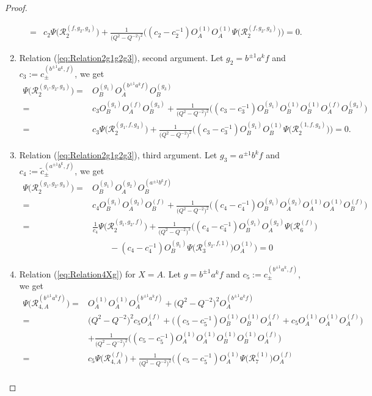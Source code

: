 \documentclass{amsart}
\newcommand{\R}{\mathcal R}
\begin{document}
\begin{proof}
\begin{enumerate}[\qquad1.]
\begin{align*}
=&c_2\Psi\big(\R_{2}^{(f,g_2,g_3)}\big)+\frac1{\big(Q^2-Q^{-2}\big)^2}\Big((c_2-c_2^{-1})O_A^{(1)}O_A^{(1)}\Psi\big(\R_{2}^{(f,g_2,g_3)}\big)\Big)=0.
\end{align*}
\item Relation (\ref{eq:Relation2g1g2g3}), second argument. Let $g_2=b^{\pm1}a^kf$ and $c_3:=c_{\pm}^{(b^{\pm1}a^k,f)}$, we get
\begin{align*}
\Psi\big(\R_{2}^{(g_1,g_2,g_3)}\big)=&O_B^{(g_1)}O_A^{(b^{\pm1}a^kf)}O_B^{(g_3)}\\
=&c_3O_B^{(g_1)}O_A^{(f)}O_B^{(g_3)}+\frac1{\big(Q^2-Q^{-2}\big)^2}\Big((c_3-c_3^{-1})O_B^{(g_1)}O_B^{(1)}O_B^{(1)}O_A^{(f)}O_B^{(g_3)}\Big)\\
=&c_3\Psi\big(\R_{2}^{(g_1,f,g_3)}\big)+\frac1{\big(Q^2-Q^{-2}\big)^2}\Big((c_3-c_3^{-1})O_B^{(g_1)}O_B^{(1)}\Psi\big(\R_{2}^{(1,f,g_3)}\big)\Big)=0.
\end{align*}
\item Relation (\ref{eq:Relation2g1g2g3}), third argument. Let $g_3=a^{\pm1}b^kf$ and $c_4:=\widetilde c_{\pm}^{(a^{\pm1}b^k,f)}$, we get
\begin{align*}
\Psi\big(\R_{2}^{(g_1,g_2,g_3)}\big)=&O_B^{(g_1)}O_A^{(g_2)}O_B^{(a^{\pm1}b^kf)}\\
=&c_4O_B^{(g_1)}O_A^{(g_2)}O_B^{(f)}+\frac1{\big(Q^2-Q^{-2}\big)^2}\Big((c_4-c_4^{-1})O_B^{(g_1)}O_A^{(g_2)}O_A^{(1)}O_A^{(1)}O_B^{(f)}\Big)\\
=&\frac{1}{c_4}\Psi\big(\R_{2}^{(g_1,g_2,f)}\big)+\frac1{\big(Q^2-Q^{-2}\big)^2}\Big((c_4-c_4^{-1})O_B^{(g_1)}O_A^{(g_2)}\Psi\big(\R_{6}^{(f)}\big)\\
&\qquad-(c_4-c_4^{-1})O_B^{(g_1)}\Psi\big(\R_{3}^{(g_2,f,1)}\big)O_A^{(1)}\Big)=0
\end{align*}
\item Relation (\ref{eq:Relation4Xg}) for $X=A$. Let $g=b^{\pm1}a^kf$ and $c_5:=c_{\pm}^{(b^{\pm1}a^k,f)}$, we get
\begin{align*}
\Psi\big(\R_{4,A}^{(b^{\pm1}a^kf)}\big)=&O_A^{(1)}O_A^{(1)}O_A^{(b^{\pm1}a^kf)}+\big(Q^2-Q^{-2}\big)^2O_A^{(b^{\pm1}a^kf)}\\
=&\big(Q^2-Q^{-2}\big)^2c_5O_A^{(f)}+\Big((c_5-c_5^{-1})O_B^{(1)}O_B^{(1)}O_A^{(f)}+c_5O_A^{(1)}O_A^{(1)}O_A^{(f)}\Big)\\
&+\frac1{\big(Q^2-Q^{-2}\big)^2}\Big((c_5-c_5^{-1})O_A^{(1)}O_A^{(1)}O_B^{(1)}O_B^{(1)}O_A^{(f)}\Big)\\
=&c_5\Psi\big(\R_{4,A}^{(f)}\big)+\frac1{\big(Q^2-Q^{-2}\big)^2}\Big((c_5-c_5^{-1})O_A^{(1)}\Psi\big(\R_{7}^{(1)}\big)O_A^{(f)}\\

\end{align*}
\end{enumerate}
\end{proof}
\end{document}
